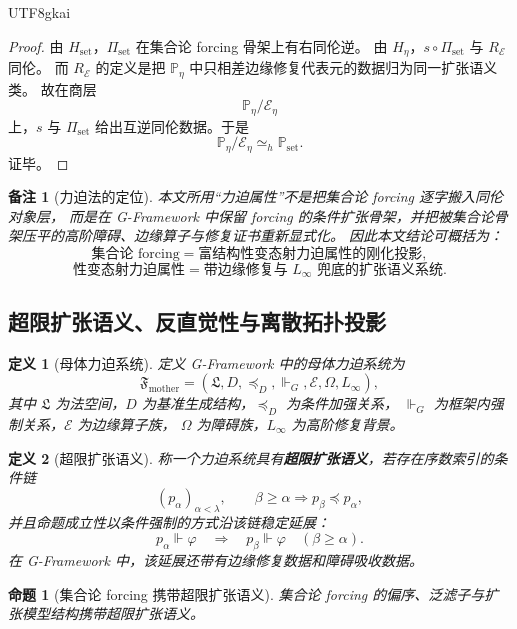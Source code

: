\documentclass[12pt]{article}
\newtheorem{definition}{定义}[section]
\newtheorem{proposition}{命题}[section]
\newtheorem{remark}{备注}[section]
\newcommand{\Law}{\mathfrak{L}}
\newcommand{\GFramework}{\textsf{G-Framework}}
\newcommand{\Linfty}{\ensuremath{L_\infty}}
\begin{document}
\begin{CJK*}{UTF8}{gkai}
\begin{proof}
由 $H_{\mathrm{set}}$，$\Pi_{\mathrm{set}}$ 在集合论 forcing 骨架上有右同伦逆。
由 $H_{\eta}$，$s\circ\Pi_{\mathrm{set}}$ 与 $R_{\mathcal E}$ 同伦。
而 $R_{\mathcal E}$ 的定义是把 $\mathbb P_\eta$ 中只相差边缘修复代表元的数据归为同一扩张语义类。
故在商层
\[
  \mathbb P_\eta/\mathcal E_\eta
\]
上，$s$ 与 $\Pi_{\mathrm{set}}$ 给出互逆同伦数据。于是
\[
  \mathbb P_\eta/\mathcal E_\eta\simeq_h\mathbb P_{\mathrm{set}}.
\]
证毕。
\end{proof}

\begin{remark}[力迫法的定位]
本文所用“力迫属性”不是把集合论 forcing 逐字搬入同伦对象层，
而是在 \GFramework{} 中保留 forcing 的条件扩张骨架，并把被集合论骨架压平的高阶障碍、边缘算子与修复证书重新显式化。
因此本文结论可概括为：
\[
  \text{集合论 forcing}
  =
  \text{富结构性变态射力迫属性的刚化投影},
\]
\[
  \text{性变态射力迫属性}
  =
  \text{带边缘修复与 }\Linfty\text{ 兜底的扩张语义系统}.
\]
\end{remark}

\subsection{超限扩张语义、反直觉性与离散拓扑投影}
\label{subsec:tex50-counterintuitive-discrete-topology}

\begin{definition}[母体力迫系统]
\label{def:tex50-mother-forcing-system}
定义 \GFramework{} 中的母体力迫系统为
\[
  \mathfrak F_{\mathrm{mother}}
  =
  (\Law,D,\preceq_D,\Vdash_G,\mathcal E,\Omega,\Linfty),
\]
其中 $\Law$ 为法空间，$D$ 为基准生成结构，$\preceq_D$ 为条件加强关系，
$\Vdash_G$ 为框架内强制关系，$\mathcal E$ 为边缘算子族，
$\Omega$ 为障碍族，\Linfty{} 为高阶修复背景。
\end{definition}

\begin{definition}[超限扩张语义]
\label{def:tex50-transfinite-extension-semantics}
称一个力迫系统具有\textbf{超限扩张语义}，若存在序数索引的条件链
\[
  (p_\alpha)_{\alpha<\lambda},
  \qquad
  \beta\ge\alpha\Rightarrow p_\beta\preceq p_\alpha,
\]
并且命题成立性以条件强制的方式沿该链稳定延展：
\[
  p_\alpha\Vdash\varphi
  \quad\Longrightarrow\quad
  p_\beta\Vdash\varphi
  \quad(\beta\ge\alpha).
\]
在 \GFramework{} 中，该延展还带有边缘修复数据和障碍吸收数据。
\end{definition}

\begin{proposition}[集合论 forcing 携带超限扩张语义]
\label{prop:tex50-set-forcing-transfinite-semantics}
集合论 forcing 的偏序、泛滤子与扩张模型结构携带超限扩张语义。
\end{proposition}


\end{CJK*}
\end{document}
